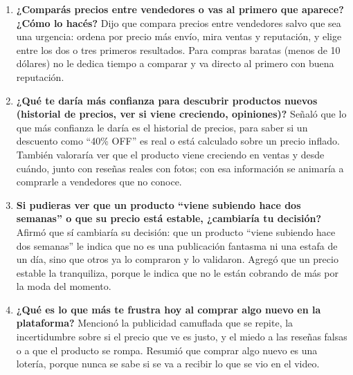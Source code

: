 \begin{enumerate}
	\item \textbf{¿Comparás precios entre vendedores o vas al primero que aparece? ¿Cómo lo hacés?} Dijo que compara precios entre vendedores salvo que sea una urgencia: ordena por precio más envío, mira ventas y reputación, y elige entre los dos o tres primeros resultados. Para compras baratas (menos de 10 dólares) no le dedica tiempo a comparar y va directo al primero con buena reputación.
	\item \textbf{¿Qué te daría más confianza para descubrir productos nuevos (historial de precios, ver si viene creciendo, opiniones)?} Señaló que lo que más confianza le daría es el historial de precios, para saber si un descuento como ``40\% OFF'' es real o está calculado sobre un precio inflado. También valoraría ver que el producto viene creciendo en ventas y desde cuándo, junto con reseñas reales con fotos; con esa información se animaría a comprarle a vendedores que no conoce.
	\item \textbf{Si pudieras ver que un producto ``viene subiendo hace dos semanas'' o que su precio está estable, ¿cambiaría tu decisión?} Afirmó que sí cambiaría su decisión: que un producto ``viene subiendo hace dos semanas'' le indica que no es una publicación fantasma ni una estafa de un día, sino que otros ya lo compraron y lo validaron. Agregó que un precio estable la tranquiliza, porque le indica que no le están cobrando de más por la moda del momento.
	\item \textbf{¿Qué es lo que más te frustra hoy al comprar algo nuevo en la plataforma?} Mencionó la publicidad camuflada que se repite, la incertidumbre sobre si el precio que ve es justo, y el miedo a las reseñas falsas o a que el producto se rompa. Resumió que comprar algo nuevo es una lotería, porque nunca se sabe si se va a recibir lo que se vio en el video.
\end{enumerate}
